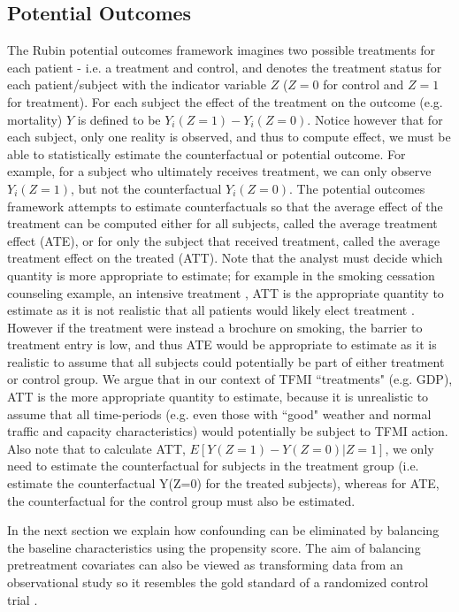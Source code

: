 \documentclass[11pt]{scrartcl}
\begin{document}
\subsection*{Potential Outcomes}
The Rubin potential outcomes framework \cite{rubin1974estimating} imagines two possible treatments for each patient - i.e. a treatment and control, and denotes the treatment status for each patient/subject with the indicator variable $Z$ ($Z=0$ for control and $Z=1$ for treatment).  For each subject the effect of the treatment on the outcome (e.g. mortality) $Y$ is defined to be $Y_i(Z=1) - Y_i(Z=0)$.  Notice however that for each subject, only one reality is observed, and thus to compute effect, we must be able to statistically estimate the counterfactual or potential outcome.  For example, for a subject who ultimately receives treatment, we can only observe $Y_i(Z=1)$, but not the counterfactual $Y_i(Z=0)$.  The potential outcomes framework attempts to estimate counterfactuals so that the average effect of the treatment can be computed either for all subjects, called the average treatment effect (ATE),  or for only the subject that received treatment, called the average treatment effect on the treated (ATT).  Note that the analyst must decide which quantity is more appropriate to estimate; for example in the smoking cessation counseling example, an intensive treatment , ATT is the appropriate quantity to estimate as it is not realistic that all patients would likely elect treatment \cite{austin2011tutorial}.  However if the treatment were instead a brochure on smoking, the barrier to treatment entry is low, and thus ATE would be appropriate to estimate as it is realistic to assume that all subjects could potentially be part of either treatment or control group.  We argue  that in our context of TFMI ``treatments" (e.g. GDP), ATT is the more appropriate quantity to estimate, because it is unrealistic to assume that all time-periods (e.g. even those with ``good" weather and normal traffic and capacity characteristics) would potentially be subject to TFMI action.  Also note that to calculate ATT, $E[Y(Z=1) - Y(Z=0)| Z=1]$, we only need to estimate the counterfactual for subjects in the treatment group (i.e. estimate the counterfactual Y(Z=0) for the treated subjects), whereas for ATE, the counterfactual for the control group must also be estimated.  

In the next section we explain how confounding can be eliminated by balancing the baseline characteristics using the propensity score.  The aim of balancing pretreatment covariates can also be viewed as transforming data from an observational study so it resembles the gold standard of a randomized control trial \cite{austin2011introduction}.  
\end{document}

